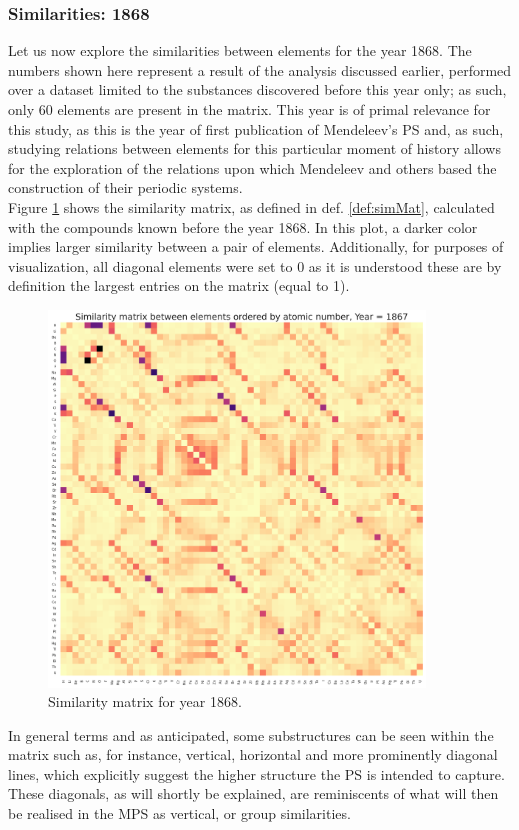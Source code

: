 \documentclass[article]{article}
\begin{document}
\subsubsection{Similarities: 1868}
Let us now explore the similarities between elements for the year 1868. The numbers shown here represent a result of the analysis discussed earlier, performed over a dataset limited to the substances discovered before this year only; as such, only 60 elements are present in the matrix. This year is of primal relevance for this study, as this is the year of first publication of Mendeleev's PS and, as such, studying relations between elements for this particular moment of history allows for the exploration of the relations upon which Mendeleev and others based the construction of their periodic systems.\\

Figure \ref{fig:simMat1867} shows the similarity matrix, as defined in def. \ref{def:simMat}, calculated with the compounds known before the year 1868. In this plot, a darker color implies larger similarity between a pair of elements. Additionally, for purposes of visualization, all diagonal elements were set to 0 as it is understood these are by definition the largest entries on the matrix (equal to 1).\\

\begin{figure}[h!]
  \centering
	\includegraphics[width=10.0cm]{simMat1867.png}
	\caption{Similarity matrix for year 1868.}
	\label{fig:simMat1867}
\end{figure}

In general terms and as anticipated, some substructures can be seen within the matrix such as, for instance, vertical, horizontal and more prominently diagonal lines, which explicitly suggest the higher structure the PS is intended to capture. These diagonals, as will shortly be explained, are reminiscents of what will then be realised in the MPS as vertical, or group similarities. \\
\end{document}
